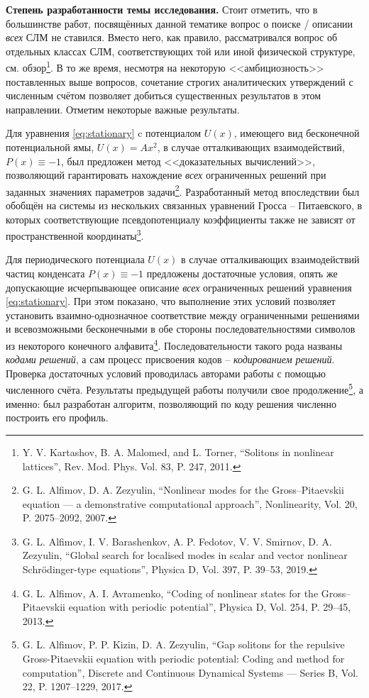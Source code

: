 \documentclass[candidate, href, colorlinks]{disser}
\begin{document}
\textbf{Степень разработанности темы исследования.}
Стоит отметить, что в большинстве работ, посвящённых данной тематике вопрос о поиске / описании {\it всех} СЛМ не ставился.
Вместо него, как правило, рассматривался вопрос об отдельных классах СЛМ, соответствующих той или иной физической структуре, см. обзор\footnote{Y. V. Kartashov, B. A. Malomed, and L. Torner, ``Solitons in nonlinear lattices'', Rev. Mod. Phys. Vol. 83, P. 247, 2011.}.
В то же время, несмотря на некоторую <<амбициозность>> поставленных выше вопросов, сочетание строгих аналитических утверждений с численным счётом позволяет добиться существенных результатов в этом направлении. 
Отметим некоторые важные результаты.

Для уравнения \eqref{eq:stationary} c потенциалом $U(x)$, имеющего вид бесконечной потенциальной ямы, $U(x) = A x^2$, в случае отталкивающих взаимодействий, $P(x) \equiv -1$, был предложен метод <<доказательных вычислений>>, позволяющий гарантировать нахождение {\it всех} ограниченных решений при заданных значениях параметров задачи\footnote{\label{note:alfzez} G. L. Alfimov, D. A. Zezyulin, ``Nonlinear modes for the Gross--Pitaevskii equation --- a demonstrative computational approach'', Nonlinearity, Vol. 20, P. 2075--2092, 2007.}.
Разработанный метод впоследствии был обобщён на системы из нескольких связанных уравнений Гросса -- Питаевского, в которых соответствующие псевдопотенциалу коэффициенты также не зависят от пространственной координаты\footnote{G. L. Alfimov, I. V. Barashenkov, A. P. Fedotov, V. V. Smirnov, D. A. Zezyulin, ``Global search for localised modes in scalar and vector nonlinear Schr{\"o}dinger-type equations'', Physica D, Vol. 397, P. 39--53, 2019.}.

Для периодического потенциала $U(x)$ в случае отталкивающих взаимодействий частиц конденсата $P(x) \equiv -1$ предложены достаточные условия, опять же допускающие исчерпывающее описание {\it всех} ограниченных решений уравнения \eqref{eq:stationary}.
При этом показано, что выполнение этих условий позволяет установить взаимно-однозначное соответствие между ограниченными решениями и всевозможными бесконечными в обе стороны последовательностями символов из некоторого конечного алфавита\footnote{\label{note:alfavr} G. L. Alfimov, A. I. Avramenko, ``Coding of nonlinear states for the Gross--Pitaevskii equation with periodic potential'', Physica D, Vol. 254, P. 29--45, 2013.}.
Последовательности такого рода названы {\it кодами решений}, а сам процесс присвоения кодов -- {\it кодированием решений}.
Проверка достаточных условий проводилась авторами работы с помощью численного счёта.
Результаты предыдущей работы получили свое продолжение\footnote{G. L. Alfimov, P. P. Kizin, D. A. Zezyulin, ``Gap solitons for the repulsive Gross-Pitaevskii equation with periodic potential: Coding and method for computation'', Discrete and Continuous Dynamical Systems --- Series B, Vol. 22, P. 1207--1229, 2017.}, а именно: был разработан алгоритм, позволяющий по коду решения численно построить его профиль.
\end{document}
